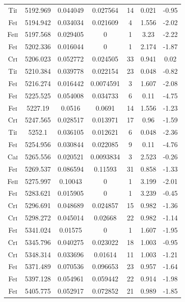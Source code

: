 \begin{longtable}{|c|c|c|c|c|c|c|}
Ti\textsc{i} & 5192.969 & 0.044049 & 0.027564 & 14 & 0.021 & -0.95 \\ 
Fe\textsc{i} & 5194.942 & 0.034034 & 0.021609 & 4 & 1.556 & -2.02 \\  
Fe\textsc{ii} & 5197.568 & 0.029405 & 0 & 1 & 3.23 & -2.22 \\          
Fe\textsc{i} & 5202.336 & 0.016044 & 0 & 1 & 2.174 & -1.87 \\         
Cr\textsc{i} & 5206.023 & 0.052772 & 0.024505 & 33 & 0.941 & 0.02 \\  
Ti\textsc{i} & 5210.384 & 0.039778 & 0.022154 & 23 & 0.048 & -0.82 \\ 
Fe\textsc{i} & 5216.274 & 0.016442 & 0.0074591 & 3 & 1.607 & -2.08 \\ 
Fe\textsc{i} & 5225.525 & 0.054008 & 0.034733 & 6 & 0.11 & -4.75 \\   
Fe\textsc{i} & 5227.19 & 0.0516 & 0.0691 & 14 & 1.556 & -1.23 \\      
Cr\textsc{i} & 5247.565 & 0.028517 & 0.013971 & 17 & 0.96 & -1.59 \\  
Ti\textsc{i} & 5252.1 & 0.036105 & 0.012621 & 6 & 0.048 & -2.36 \\    
Fe\textsc{i} & 5254.956 & 0.030844 & 0.022085 & 9 & 0.11 & -4.76 \\   
Ca\textsc{i} & 5265.556 & 0.020521 & 0.0093834 & 3 & 2.523 & -0.26 \\ 
Fe\textsc{i} & 5269.537 & 0.086594 & 0.11593 & 31 & 0.858 & -1.33 \\  
Fe\textsc{ii} & 5275.997 & 0.10043 & 0 & 1 & 3.199 & -2.01 \\          
Fe\textsc{i} & 5283.621 & 0.015905 & 0 & 1 & 3.239 & -0.45 \\         
Cr\textsc{i} & 5296.691 & 0.048689 & 0.024857 & 15 & 0.982 & -1.36 \\ 
Cr\textsc{i} & 5298.272 & 0.045014 & 0.02668 & 22 & 0.982 & -1.14 \\  
Fe\textsc{i} & 5341.024 & 0.01575 & 0 & 1 & 1.607 & -1.95 \\          
Cr\textsc{i} & 5345.796 & 0.040275 & 0.023022 & 18 & 1.003 & -0.95 \\ 
Cr\textsc{i} & 5348.314 & 0.033696 & 0.01614 & 11 & 1.003 & -1.21 \\  
Fe\textsc{i} & 5371.489 & 0.070536 & 0.096653 & 23 & 0.957 & -1.64 \\ 
Fe\textsc{i} & 5397.128 & 0.054961 & 0.059442 & 22 & 0.914 & -1.98 \\ 
Fe\textsc{i} & 5405.775 & 0.052917 & 0.072852 & 21 & 0.989 & -1.85 \\ 

\end{longtable}
